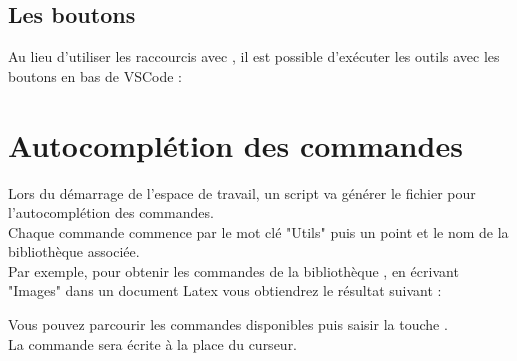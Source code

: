 \subsection{Les boutons}

Au lieu d'utiliser les raccourcis avec , il est possible d’exécuter les outils avec les boutons en bas de VSCode : 




\section{Autocomplétion des commandes}

Lors du démarrage de l'espace de travail, un script va générer le fichier pour l'autocomplétion des commandes.\\
Chaque commande commence par le mot clé "Utils" puis un point et le nom de la bibliothèque associée. \\

Par exemple, pour obtenir les commandes de la bibliothèque , en écrivant "Images" dans un document Latex vous obtiendrez le résultat suivant : 


Vous pouvez parcourir les commandes disponibles puis saisir la touche .\\
La commande sera écrite à la place du curseur.





